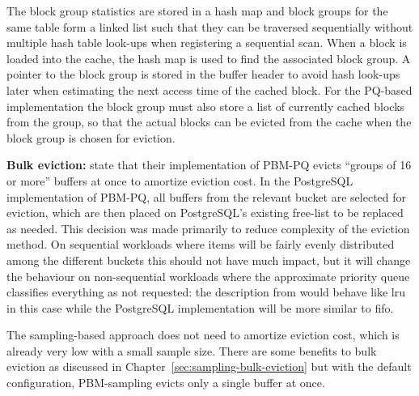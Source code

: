 The block group statistics are stored in a hash map and block groups for the same table form a linked list such that they can be traversed sequentially without multiple hash table look-ups when registering a sequential scan. %
When a block is loaded into the cache, the hash map is used to find the associated block group. A pointer to the block group is stored in the buffer header to avoid hash look-ups later when estimating the next access time of the cached block. For the PQ-based implementation the block group must also store a list of currently cached blocks from the group, so that the actual blocks can be evicted from the cache when the block group is chosen for eviction. 



\textbf{Bulk eviction:} \citet{pbm} state that their implementation of PBM-PQ evicts ``groups of 16 or more'' buffers at once to amortize eviction cost. In the PostgreSQL implementation of PBM-PQ, all buffers from the relevant bucket are selected for eviction, which are then placed on PostgreSQL's existing free-list to be replaced as needed. This decision was made primarily to reduce complexity of the eviction method. On sequential workloads where items will be fairly evenly distributed among the different buckets this should not have much impact, but it will change the behaviour on non-sequential workloads where the approximate priority queue classifies everything as not requested: the description from \cite{pbm} would behave like \gls{lru} in this case while the PostgreSQL implementation will be more similar to \gls{fifo}.

The sampling-based approach does not need to amortize eviction cost, which is already very low with a small sample size. There are some benefits to bulk eviction as discussed in Chapter~\ref{sec:sampling-bulk-eviction} but with the default configuration, PBM-sampling evicts only a single buffer at once.



